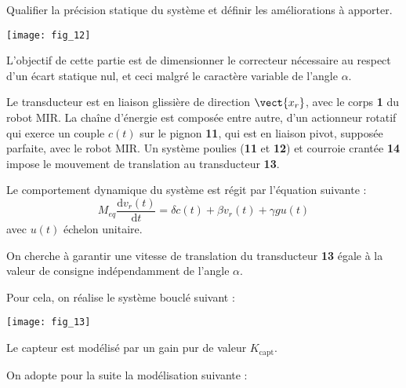 \begin{obj}
Qualifier la précision statique du système et définir les améliorations à apporter.
\end{obj}

\begin{marginfigure}
	\texttt{[image: fig\_12]}
\end{marginfigure}

L’objectif de cette partie est de dimensionner le correcteur nécessaire au respect d’un écart statique nul, et ceci malgré le caractère variable de l’angle $\alpha$.

Le transducteur est en liaison glissière de direction $\vect{x_r}$, avec le corps \textbf{1} du robot MIR. La chaîne d’énergie est composée entre autre, d’un actionneur rotatif qui exerce un couple $c(t)$ sur le pignon \textbf{11}, qui est en liaison pivot, supposée parfaite, avec le robot MIR.
Un système poulies (\textbf{11} et \textbf{12}) et courroie crantée \textbf{14} impose le mouvement de translation au transducteur \textbf{13}.
 
 Le comportement dynamique du système est régit par l'équation suivante  :
 $$
 M_{eq}\dfrac{\text{d}v_r(t)}{\text{d}t}=\delta c(t) + \beta v_r(t) + \gamma g u(t)
 $$
avec $u(t)$ échelon unitaire.

On cherche à garantir une vitesse de translation du transducteur \textbf{13} égale à la valeur de consigne indépendamment de l’angle $\alpha$.

Pour cela, on réalise le système bouclé suivant :

\begin{center}
	\texttt{[image: fig\_13]}
\end{center}



\ifprof
\begin{corrige}
\end{corrige}
\else
\fi


Le capteur est modélisé par un gain pur de valeur $K_{\text{capt}}$.

\ifprof
\begin{corrige}
\end{corrige}
\else
\fi
On adopte pour la suite la modélisation suivante :

